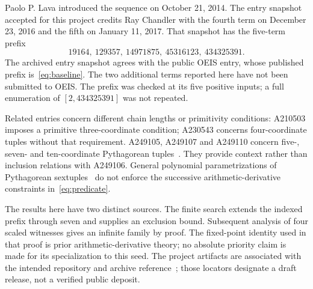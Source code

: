 \documentclass[11pt,a4paper]{article}
\theoremstyle{remark}
\begin{document}
Paolo P. Lava introduced the sequence on October 21, 2014. The entry snapshot
accepted for this project credits Ray Chandler with the fourth term on
December 23, 2016 and the fifth on January 11, 2017. That snapshot has the
five-term prefix
\begin{equation}\label{eq:baseline}
19164,\ 129357,\ 14971875,\ 45316123,\ 434325391.
\end{equation}
The archived entry snapshot agrees with the public OEIS entry, whose
published prefix is~\eqref{eq:baseline}. The two additional terms reported
here have not been submitted to OEIS.
The prefix was checked at its five positive inputs; a full enumeration of
$[2,434325391]$ was not repeated.

Related entries concern different chain lengths or primitivity conditions:
A210503 imposes a primitive three-coordinate condition; A230543 concerns
four-coordinate tuples without that requirement. A249105, A249107 and A249110
concern five-, seven- and ten-coordinate
Pythagorean tuples~\cite{related}. They provide context rather than inclusion
relations with A249106. General polynomial parametrizations of Pythagorean
sextuples~\cite{frisch} do not enforce the successive arithmetic-derivative
constraints in~\eqref{eq:predicate}.

The results here have two distinct sources. The finite search extends the
indexed prefix through seven and supplies an exclusion bound. Subsequent
analysis of four scaled witnesses gives an infinite family by proof. The
fixed-point identity used in that proof is prior arithmetic-derivative theory;
no absolute priority claim is made for its specialization to this seed.
The project artifacts are associated with the intended repository and archive
reference~\cite{project}; those locators designate a draft release, not a
verified public deposit.
\end{document}
